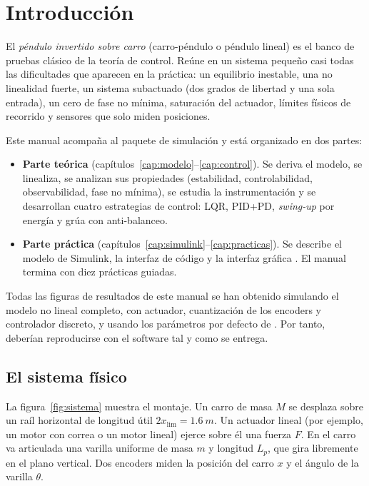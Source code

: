 \chapter{Introducción}
\label{cap:intro}

El \emph{péndulo invertido sobre carro} (carro-péndulo o péndulo lineal) es el banco de pruebas clásico de la teoría de control. Reúne en un sistema pequeño casi todas las dificultades que aparecen en la práctica: un equilibrio inestable, una no linealidad fuerte, un sistema subactuado (dos grados de libertad y una sola entrada), un cero de fase no mínima, saturación del actuador, límites físicos de recorrido y sensores que solo miden posiciones.

Este manual acompaña al paquete de simulación  y está organizado en dos partes:

\begin{itemize}
  \item \textbf{Parte teórica} (capítulos~\ref{cap:modelo}--\ref{cap:control}). Se deriva el modelo, se linealiza, se analizan sus propiedades (estabilidad, controlabilidad, observabilidad, fase no mínima), se estudia la instrumentación y se desarrollan cuatro estrategias de control: LQR, PID+PD, \emph{swing-up} por energía y grúa con anti-balanceo.
  \item \textbf{Parte práctica} (capítulos~\ref{cap:simulink}--\ref{cap:practicas}). Se describe el modelo de Simulink, la interfaz de código  y la interfaz gráfica . El manual termina con diez prácticas guiadas.
\end{itemize}

Todas las figuras de resultados de este manual se han obtenido simulando el modelo no lineal completo, con actuador, cuantización de los encoders y controlador discreto, y usando los parámetros por defecto de . Por tanto, deberían reproducirse con el software tal y como se entrega.

\section{El sistema físico}

La figura~\ref{fig:sistema} muestra el montaje. Un carro de masa $M$ se desplaza sobre un raíl horizontal de longitud útil $2x_{\lim}=\SI{1.6}{m}$. Un actuador lineal (por ejemplo, un motor con correa o un motor lineal) ejerce sobre él una fuerza $F$. En el carro va articulada una varilla uniforme de masa $m$ y longitud $L_p$, que gira libremente en el plano vertical. Dos encoders miden la posición del carro $x$ y el ángulo de la varilla $\theta$.

